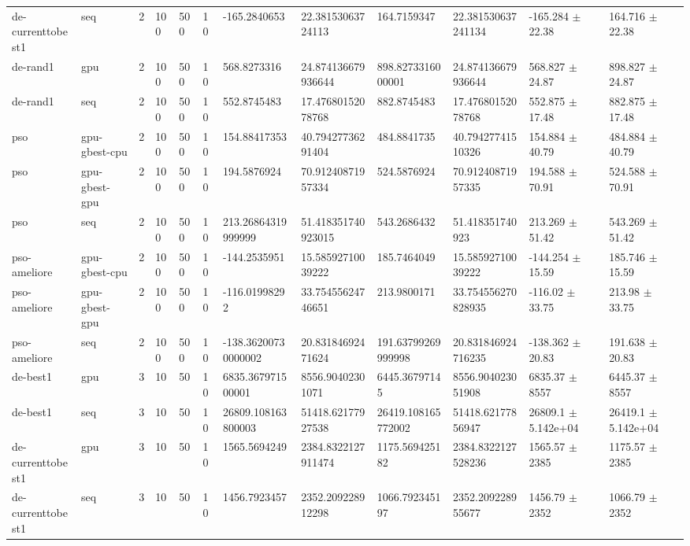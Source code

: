 \begin{table}[t]
\begin{tabular}{llllllllllll}
de-currenttobest1 & seq & 2 & 100 & 500 & 10 & -165.2840653 & 22.38153063724113 & 164.7159347 & 22.381530637241134 & -165.284 $\pm$ 22.38 & 164.716 $\pm$ 22.38 \\
de-rand1 & gpu & 2 & 100 & 500 & 10 & 568.8273316 & 24.874136679936644 & 898.8273316000001 & 24.874136679936644 & 568.827 $\pm$ 24.87 & 898.827 $\pm$ 24.87 \\
de-rand1 & seq & 2 & 100 & 500 & 10 & 552.8745483 & 17.47680152078768 & 882.8745483 & 17.47680152078768 & 552.875 $\pm$ 17.48 & 882.875 $\pm$ 17.48 \\
pso & gpu-gbest-cpu & 2 & 100 & 500 & 10 & 154.88417353 & 40.79427736291404 & 484.8841735 & 40.79427741510326 & 154.884 $\pm$ 40.79 & 484.884 $\pm$ 40.79 \\
pso & gpu-gbest-gpu & 2 & 100 & 500 & 10 & 194.5876924 & 70.91240871957334 & 524.5876924 & 70.91240871957335 & 194.588 $\pm$ 70.91 & 524.588 $\pm$ 70.91 \\
pso & seq & 2 & 100 & 500 & 10 & 213.26864319999999 & 51.418351740923015 & 543.2686432 & 51.418351740923 & 213.269 $\pm$ 51.42 & 543.269 $\pm$ 51.42 \\
pso-ameliore & gpu-gbest-cpu & 2 & 100 & 500 & 10 & -144.2535951 & 15.58592710039222 & 185.7464049 & 15.58592710039222 & -144.254 $\pm$ 15.59 & 185.746 $\pm$ 15.59 \\
pso-ameliore & gpu-gbest-gpu & 2 & 100 & 500 & 10 & -116.01998292 & 33.75455624746651 & 213.9800171 & 33.754556270828935 & -116.02 $\pm$ 33.75 & 213.98 $\pm$ 33.75 \\
pso-ameliore & seq & 2 & 100 & 500 & 10 & -138.36200730000002 & 20.83184692471624 & 191.63799269999998 & 20.831846924716235 & -138.362 $\pm$ 20.83 & 191.638 $\pm$ 20.83 \\
de-best1 & gpu & 3 & 10 & 50 & 10 & 6835.367971500001 & 8556.90402301071 & 6445.36797145 & 8556.904023051908 & 6835.37 $\pm$ 8557 & 6445.37 $\pm$ 8557 \\
de-best1 & seq & 3 & 10 & 50 & 10 & 26809.108163800003 & 51418.62177927538 & 26419.108165772002 & 51418.62177856947 & 26809.1 $\pm$ 5.142e+04 & 26419.1 $\pm$ 5.142e+04 \\
de-currenttobest1 & gpu & 3 & 10 & 50 & 10 & 1565.5694249 & 2384.8322127911474 & 1175.569425182 & 2384.8322127528236 & 1565.57 $\pm$ 2385 & 1175.57 $\pm$ 2385 \\
de-currenttobest1 & seq & 3 & 10 & 50 & 10 & 1456.7923457 & 2352.209228912298 & 1066.792345197 & 2352.209228955677 & 1456.79 $\pm$ 2352 & 1066.79 $\pm$ 2352 \\

\end{tabular}
\end{table}
